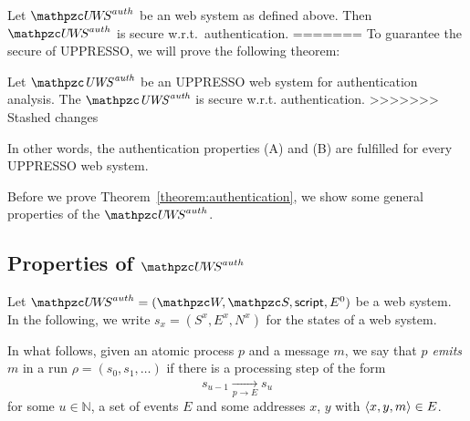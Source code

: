   
  
  \begin{theorem}\label{thm:authentication}
    Let $\uppressoauthwebsystem$ be an \uppresso web system as
    defined above. Then $\uppressoauthwebsystem$ is secure
    w.r.t.~authentication.
=======
  To guarantee the secure of UPPRESSO, we will prove the following theorem:
  \begin{theorem}\label{theorem:authentication}
  Let $\mi{\uppressoauthwebsystem}$ be an UPPRESSO web system for authentication analysis. The $\mi{\uppressoauthwebsystem}$ is secure w.r.t. authentication.
>>>>>>> Stashed changes
  \end{theorem}
  In other words, the authentication properties (A) and (B) are fulfilled for every UPPRESSO web system.
  
  Before we prove Theorem~\ref{theorem:authentication}, we show some general properties of the $\uppressoauthwebsystem$.

\subsection{Properties of $\uppressoauthwebsystem$}

Let $\uppressoauthwebsystem = (\bidsystem, \scriptset, \mathsf{script}, E^0)$
be a web system. In the following, we write $s_x = (S^x,E^x,N^x)$ for the
states of a web system.

\begin{definition}\label{def:emitting}
  In what follows, given an atomic process $p$ and a message $m$, we
  say that \emph{$p$ emits $m$} in a run $\rho=(s_0,s_1,\ldots)$ if
  there is a processing step  of the form
  \[ s_{u-1} \xrightarrow[p \rightarrow E]{} s_{u}\] for some $u \in
  \mathbb{N}$, a set of events $E$ and some addresses $x$, $y$ with
  $\langle x,y,m\rangle \in E$.
\end{definition}


\end{theorem}
